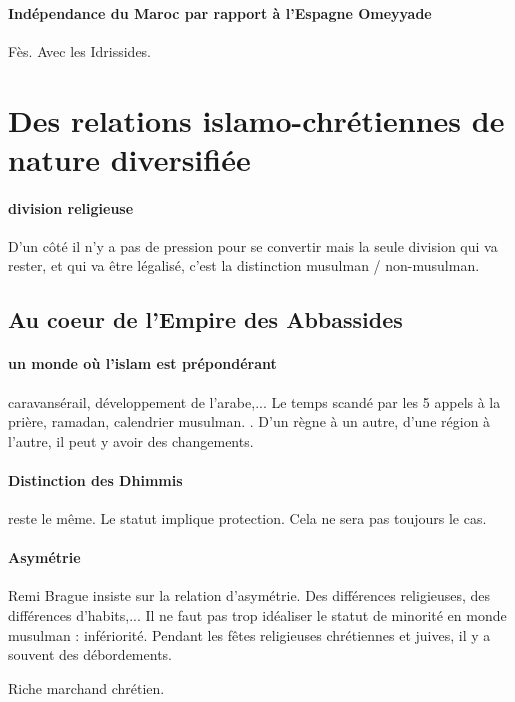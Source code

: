 \paragraph{Indépendance du Maroc par rapport à l'Espagne Omeyyade} Fès. Avec les Idrissides. 






\section{Des relations islamo-chrétiennes de nature diversifiée}

\paragraph{division religieuse} D'un côté il n'y a pas de pression pour se convertir mais la seule division qui va rester, et qui va être légalisé, c'est la distinction musulman / non-musulman. 


\subsection{Au coeur de l'Empire des Abbassides}

\paragraph{un monde où l'islam est prépondérant} caravansérail, développement de l'arabe,... Le temps scandé par les 5 appels à la prière, ramadan, calendrier musulman.  . D'un règne à un autre, d'une région à l'autre, il peut y avoir des changements.

\paragraph{Distinction des Dhimmis} reste le même. Le statut implique protection. Cela ne sera pas toujours le cas. 

\paragraph{Asymétrie} Remi Brague insiste sur la relation d'asymétrie.  Des différences religieuses, des différences d'habits,... Il ne faut pas trop idéaliser le statut de minorité en monde musulman : infériorité.
Pendant les fêtes religieuses chrétiennes et juives, il y a souvent des débordements. 
\begin{Ex}
Riche marchand chrétien. 
\end{Ex}


